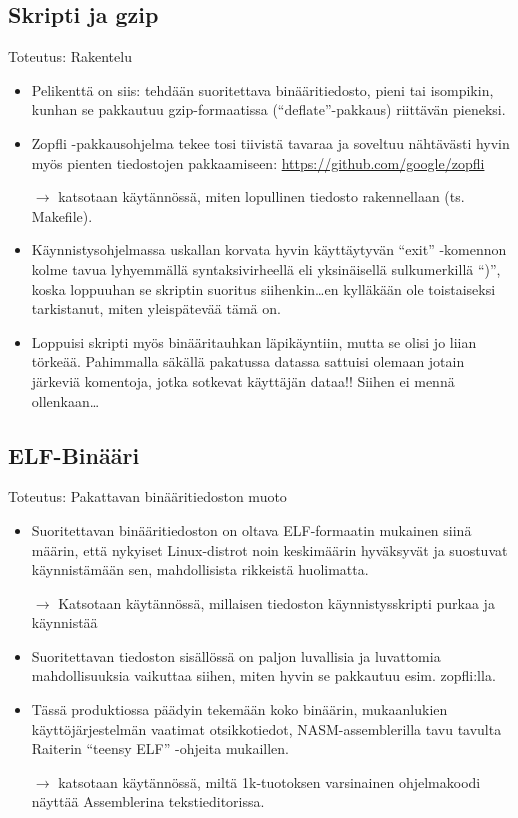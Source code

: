 \documentclass[pdf,10pt]{beamer}
\begin{document}
\subsection{Skripti ja gzip}
\begin{frame}{Toteutus: Rakentelu}
  \begin{itemize}
    \item Pelikenttä on siis: tehdään suoritettava binääritiedosto,
      pieni tai isompikin, kunhan se pakkautuu gzip-formaatissa
      (``deflate''-pakkaus) riittävän pieneksi.
    \item Zopfli -pakkausohjelma tekee tosi tiivistä tavaraa ja
      soveltuu nähtävästi hyvin myös pienten tiedostojen pakkaamiseen:
      \url{https://github.com/google/zopfli}
    \item[$\rightarrow$] katsotaan käytännössä, miten lopullinen
      tiedosto rakennellaan (ts. Makefile).
    \item Käynnistysohjelmassa uskallan korvata hyvin käyttäytyvän
      ``exit'' -komennon kolme tavua lyhyemmällä syntaksivirheellä eli
      yksinäisellä sulkumerkillä ``)'', koska loppuuhan se skriptin
      suoritus siihenkin\ldots en kylläkään ole toistaiseksi
      tarkistanut, miten yleispätevää tämä on.
    \item Loppuisi skripti myös binääritauhkan läpikäyntiin, mutta se
      olisi jo liian törkeää. Pahimmalla säkällä pakatussa datassa
      sattuisi olemaan jotain järkeviä komentoja, jotka sotkevat
      käyttäjän dataa!! Siihen ei mennä ollenkaan\ldots
  \end{itemize}
\end{frame}

\subsection{ELF-Binääri}
\begin{frame}{Toteutus: Pakattavan binääritiedoston muoto}
  \begin{itemize}
    \item Suoritettavan binääritiedoston on oltava ELF-formaatin
      mukainen siinä määrin, että nykyiset Linux-distrot noin
      keskimäärin hyväksyvät ja suostuvat käynnistämään sen,
      mahdollisista rikkeistä huolimatta.
    \item[$\rightarrow$] Katsotaan käytännössä, millaisen tiedoston
      käynnistysskripti purkaa ja käynnistää
    \item Suoritettavan tiedoston sisällössä on paljon luvallisia ja
      luvattomia mahdollisuuksia vaikuttaa siihen, miten hyvin se
      pakkautuu esim. zopfli:lla.
    \item Tässä produktiossa päädyin tekemään koko binäärin,
      mukaanlukien käyttöjärjestelmän vaatimat otsikkotiedot,
      NASM-assemblerilla tavu tavulta Raiterin ``teensy ELF'' -ohjeita
      mukaillen.
    \item[$\rightarrow$] katsotaan käytännössä, miltä 1k-tuotoksen
      varsinainen ohjelmakoodi näyttää Assemblerina tekstieditorissa.
  \end{itemize}
\end{frame}
\end{document}
